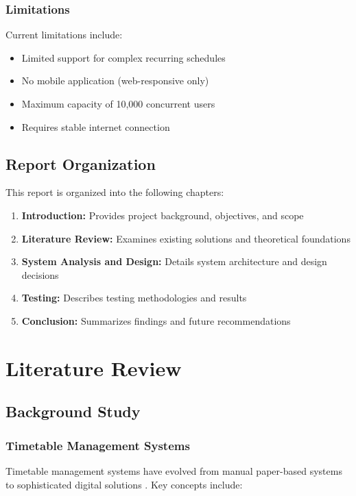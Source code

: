 \documentclass[12pt,a4paper]{report}
\begin{document}
\subsection{Limitations}
Current limitations include:
\begin{itemize}
    \item Limited support for complex recurring schedules
    \item No mobile application (web-responsive only)
    \item Maximum capacity of 10,000 concurrent users
    \item Requires stable internet connection
\end{itemize}

\section{Report Organization}
This report is organized into the following chapters:

\begin{enumerate}
    \item \textbf{Introduction:} Provides project background, objectives, and scope
    \item \textbf{Literature Review:} Examines existing solutions and theoretical foundations
    \item \textbf{System Analysis and Design:} Details system architecture and design decisions
    \item \textbf{Testing:} Describes testing methodologies and results
    \item \textbf{Conclusion:} Summarizes findings and future recommendations
\end{enumerate}

\chapter{Literature Review}
\section{Background Study}
\subsection{Timetable Management Systems}
Timetable management systems have evolved from manual paper-based systems to sophisticated digital solutions \cite{timetable_systems}. Key concepts include:
\end{document}
